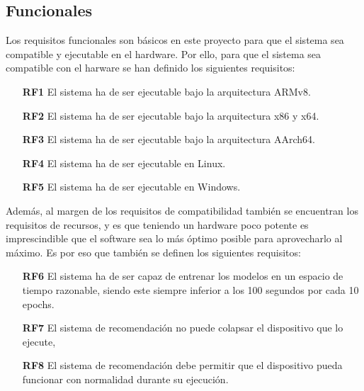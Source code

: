 \subsection{Funcionales}
Los requisitos funcionales son básicos en este proyecto para que el sistema sea compatible y ejecutable en el hardware. Por ello, para que el sistema sea compatible con el harware se han definido los siguientes requisitos:
\begin{itemize}
    \item [\textbf{RF1}] El sistema ha de ser ejecutable bajo la arquitectura ARMv8.
    \item [\textbf{RF2}] El sistema ha de ser ejecutable bajo la arquitectura x86 y x64.
    \item [\textbf{RF3}] El sistema ha de ser ejecutable bajo la arquitectura AArch64.
    \item [\textbf{RF4}] El sistema ha de ser ejecutable en Linux.
    \item [\textbf{RF5}] El sistema ha de ser ejecutable en Windows.
\end{itemize}

Además, al margen de los requisitos de compatibilidad también se encuentran los requisitos de recursos, y es que teniendo un hardware poco potente es imprescindible que el software sea lo más óptimo posible para aprovecharlo al máximo. Es por eso que también se definen los siguientes requisitos:
\begin{itemize}
    \item [\textbf{RF6}] El sistema ha de ser capaz de entrenar los modelos en un espacio de tiempo razonable, siendo este siempre inferior a los 100 segundos por cada 10 epochs.
    \item [\textbf{RF7}] El sistema de recomendación no puede colapsar el dispositivo que lo ejecute,
    \item [\textbf{RF8}] El sistema de recomendación debe permitir que el dispositivo pueda funcionar con normalidad durante su ejecución.
\end{itemize}